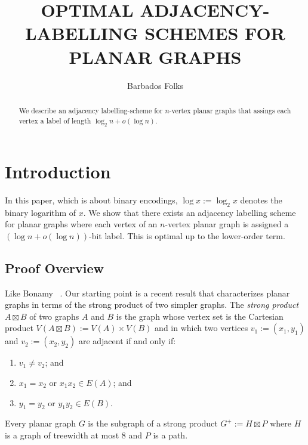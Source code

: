 \documentclass[kpfonts]{patmorin}
\title{\MakeUppercase{Optimal Adjacency-Labelling Schemes for Planar Graphs}}
\author{Barbados Folks}
\begin{document}
\begin{titlepage}
\maketitle

\begin{abstract}
  We describe an adjacency labelling-scheme for $n$-vertex planar graphs that assings each vertex a label of length $\log_2 n+o(\log n)$.  
\end{abstract}
\end{titlepage}
\tableofcontents

\newpage

\setcounter{page}{0}
\section{Introduction}

In this paper, which is about binary encodings, $\log x:=\log_2 x$ denotes the binary logarithm of $x$.  We show that there exists an adjacency labelling scheme for planar graphs where each vertex of an $n$-vertex planar graph is assigned a $(\log n+o(\log n))$-bit label.  This is optimal up to the lower-order term.


\subsection{Proof Overview}

Like Bonamy \etal\ \cite{bonamy.gavoille.ea:shorter}.  Our starting point is a recent result that characterizes planar graphs in terms of the strong product of two simpler graphs.  The \emph{strong product} $A\boxtimes B$ of two graphs $A$ and $B$ is the graph whose vertex set is the Cartesian product $V(A\boxtimes B):=V(A)\times V(B)$ and in which two vertices $v_1:=(x_1,y_1)$ and $v_2:=(x_2,y_2)$ are adjacent if and only if:
\begin{enumerate}
  \item  $v_1\neq v_2$; and
  \item $x_1=x_2$ or $x_1x_2\in E(A)$; and
  \item $y_1=y_2$ or $y_1y_2\in E(B)$.
\end{enumerate}

\begin{thm}
  Every planar graph $G$ is the subgraph of a strong product $G^+:=H\boxtimes P$ where $H$ is a graph of treewidth at most 8 and $P$ is a path.
\end{thm}
\end{document}
